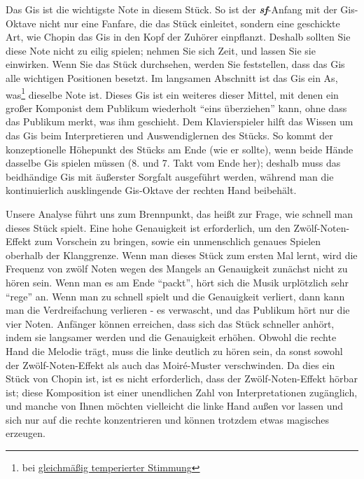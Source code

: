 Das Gis ist die wichtigste Note in diesem Stück.
So ist der \textit{\textbf{sf}}-Anfang mit der Gis-Oktave nicht nur eine Fanfare, die das Stück einleitet, sondern eine geschickte Art, wie Chopin das Gis in den Kopf der Zuhörer einpflanzt.
Deshalb sollten Sie diese Note nicht zu eilig spielen; nehmen Sie sich Zeit, und lassen Sie sie einwirken.
Wenn Sie das Stück durchsehen, werden Sie feststellen, dass das Gis alle wichtigen Positionen besetzt.
Im langsamen Abschnitt ist das Gis ein As, was\footnote{bei \hyperref[et1]{gleichmäßig temperierter Stimmung}} dieselbe Note ist.
Dieses Gis ist ein weiteres dieser Mittel, mit denen ein großer Komponist dem Publikum wiederholt \enquote{eins überziehen} kann, ohne dass das Publikum merkt, was ihm geschieht.
Dem Klavierspieler hilft das Wissen um das Gis beim Interpretieren und Auswendiglernen des Stücks.
So kommt der konzeptionelle Höhepunkt des Stücks am Ende (wie er sollte), wenn beide Hände dasselbe Gis spielen müssen (8. und 7. Takt vom Ende her); deshalb muss das beidhändige Gis mit äußerster Sorgfalt ausgeführt werden, während man die kontinuierlich ausklingende Gis-Oktave der rechten Hand beibehält.

Unsere Analyse führt uns zum Brennpunkt, das heißt zur Frage, wie schnell man dieses Stück spielt.
Eine hohe Genauigkeit ist erforderlich, um den Zwölf-Noten-Effekt zum Vorschein zu bringen, sowie ein unmenschlich genaues Spielen oberhalb der Klanggrenze.
Wenn man dieses Stück zum ersten Mal lernt, wird die Frequenz von zwölf Noten wegen des Mangels an Genauigkeit zunächst nicht zu hören sein.
Wenn man es am Ende \enquote{packt}, hört sich die Musik urplötzlich sehr \enquote{rege} an.
Wenn man zu schnell spielt und die Genauigkeit verliert, dann kann man die Verdreifachung verlieren -  es verwascht, und das Publikum hört nur die vier Noten.
Anfänger können erreichen, dass sich das Stück schneller anhört, indem sie langsamer werden und die Genauigkeit erhöhen.
Obwohl die rechte Hand die Melodie trägt, muss die linke deutlich zu hören sein, da sonst sowohl der Zwölf-Noten-Effekt als auch das Moiré-Muster verschwinden.
Da dies ein Stück von Chopin ist, ist es nicht erforderlich, dass der Zwölf-Noten-Effekt hörbar ist; diese Komposition ist einer unendlichen Zahl von Interpretationen zugänglich, und manche von Ihnen möchten vielleicht die linke Hand außen vor lassen und sich nur auf die rechte konzentrieren und können trotzdem etwas magisches erzeugen.

